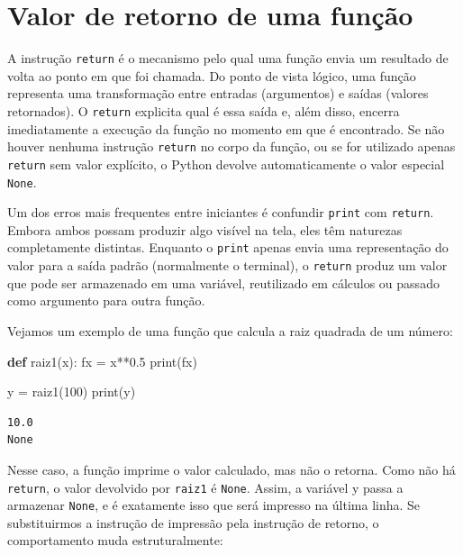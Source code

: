 \documentclass[
  brazilian,
  letterpaper,
  DIV=11,
  numbers=noendperiod]{scrreprt}
\newenvironment{Shaded}{\begin{snugshade}}{\end{snugshade}}
\newcommand{\BuiltInTok}[1]{\textcolor[rgb]{0.00,0.23,0.31}{#1}}
\newcommand{\DecValTok}[1]{\textcolor[rgb]{0.68,0.00,0.00}{#1}}
\newcommand{\FloatTok}[1]{\textcolor[rgb]{0.68,0.00,0.00}{#1}}
\newcommand{\KeywordTok}[1]{\textcolor[rgb]{0.00,0.23,0.31}{\textbf{#1}}}
\newcommand{\NormalTok}[1]{\textcolor[rgb]{0.00,0.23,0.31}{#1}}
\newcommand{\OperatorTok}[1]{\textcolor[rgb]{0.37,0.37,0.37}{#1}}
\begin{document}
\section{Valor de retorno de uma
função}\label{valor-de-retorno-de-uma-funuxe7uxe3o}

A instrução \texttt{return} é o mecanismo pelo qual uma função envia um
resultado de volta ao ponto em que foi chamada. Do ponto de vista
lógico, uma função representa uma transformação entre entradas
(argumentos) e saídas (valores retornados). O \texttt{return} explicita
qual é essa saída e, além disso, encerra imediatamente a execução da
função no momento em que é encontrado. Se não houver nenhuma instrução
\texttt{return} no corpo da função, ou se for utilizado apenas
\texttt{return} sem valor explícito, o Python devolve automaticamente o
valor especial \texttt{None}.

Um dos erros mais frequentes entre iniciantes é confundir \texttt{print}
com \texttt{return}. Embora ambos possam produzir algo visível na tela,
eles têm naturezas completamente distintas. Enquanto o \texttt{print}
apenas envia uma representação do valor para a saída padrão (normalmente
o terminal), o \texttt{return} produz um valor que pode ser armazenado
em uma variável, reutilizado em cálculos ou passado como argumento para
outra função.

Vejamos um exemplo de uma função que calcula a raiz quadrada de um
número:

\begin{Shaded}
\begin{Highlighting}[]
\KeywordTok{def}\NormalTok{ raiz1(x):}
\NormalTok{    fx }\OperatorTok{=}\NormalTok{ x}\OperatorTok{**}\FloatTok{0.5}
    \BuiltInTok{print}\NormalTok{(fx)}

\NormalTok{y }\OperatorTok{=}\NormalTok{ raiz1(}\DecValTok{100}\NormalTok{)}
\BuiltInTok{print}\NormalTok{(y)}
\end{Highlighting}
\end{Shaded}

\begin{verbatim}
10.0
None
\end{verbatim}

Nesse caso, a função imprime o valor calculado, mas não o retorna. Como
não há \texttt{return}, o valor devolvido por \texttt{raiz1} é
\texttt{None}. Assim, a variável y passa a armazenar \texttt{None}, e é
exatamente isso que será impresso na última linha. Se substituirmos a
instrução de impressão pela instrução de retorno, o comportamento muda
estruturalmente:
\end{document}

